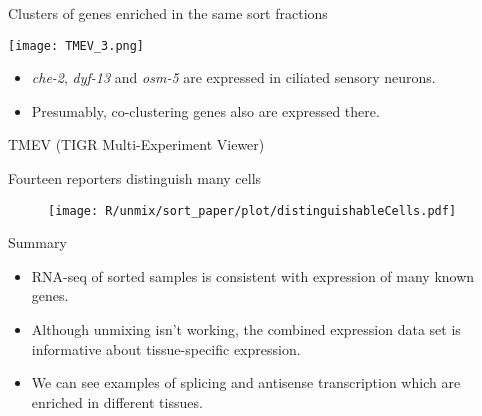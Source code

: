 \documentclass[serif,9pt]{beamer}
\begin{document}
\begin{frame}{Clusters of genes enriched in the same sort fractions}

\begin{minipage}{0.45\textwidth}
\texttt{[image: TMEV\_3.png]}
\end{minipage}
\begin{minipage}{0.48\textwidth}
\begin{itemize}

\item {\em che-2}, {\em dyf-13} and {\em osm-5} are expressed in ciliated
sensory neurons.

\item Presumably, co-clustering genes also are expressed there.
\end{itemize}

\end{minipage}

\hfill TMEV (TIGR Multi-Experiment Viewer)
\end{frame}

\begin{frame}{Fourteen reporters distinguish many cells}

\begin{figure}
\begin{centering}
\texttt{[image: R/unmix/sort\_paper/plot/distinguishableCells.pdf]}

\end{centering}
\end{figure}

\end{frame}

\begin{frame}{Summary}

\begin{itemize}

\item RNA-seq of sorted samples is consistent with
expression of many known genes.

\item Although unmixing isn't working, the combined expression data
set is informative about tissue-specific expression.

\item We can see examples of splicing and antisense transcription
which are enriched in different tissues.

\end{itemize}

\end{frame}
\end{document}
